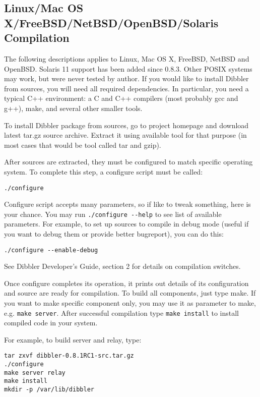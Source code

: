 \subsection{Linux/Mac OS X/FreeBSD/NetBSD/OpenBSD/Solaris Compilation}
The following descriptions applies to Linux, Mac OS X, FreeBSD, NetBSD
and OpenBSD. Solaris 11 support has been added since 0.8.3.
Other POSIX systems may work, but were never tested by
author. If you would like to install Dibbler from sources, you will need all
required dependencies. In particular, you need a typical C++
environment: a C and C++ compilers (most probably gcc and g++), make,
and several other smaller tools.

To install Dibbler package from sources, go to project homepage and
download latest tar.gz source archive. Extract it using available tool
for that purpose (in most cases that would be tool called tar and
gzip).

After sources are extracted, they must be configured to match specific
operating system. To complete this step, a configure script must be
called:
\begin{lstlisting}
./configure
\end{lstlisting}

Configure script accepts many parameters, so if like to tweak
something, here is your chance. You may run \verb+./configure --help+
to see list of available parameters. For example, to set up sources to
compile in debug mode (useful if you want to debug them or provide
better bugreport), you can do this:

\begin{lstlisting}
./configure --enable-debug
\end{lstlisting}

See Dibbler Developer's Guide, section 2 for details on compilation switches.

Once configure completes its operation, it prints out details of its
configuration and source are ready for compilation. To build all
components, just type make. If you want to make specific component
only, you may use it as parameter to make, e.g.
\verb+make server+. After successful compilation type \verb+make install+ to
install compiled code in your system.

For example, to build server and relay, type:

\begin{lstlisting}
tar zxvf dibbler-0.8.1RC1-src.tar.gz
./configure
make server relay
make install
mkdir -p /var/lib/dibbler
\end{lstlisting}

